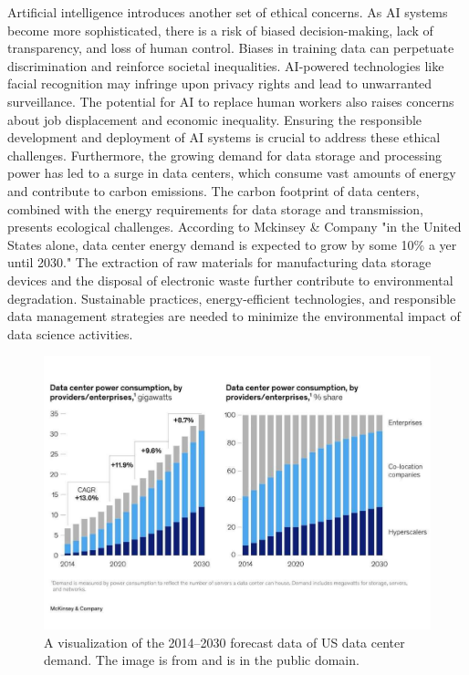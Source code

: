 \documentclass{vgtc}                          %
\begin{document}
Artificial intelligence introduces another set of ethical concerns. As AI systems become more sophisticated, there is a risk of biased decision-making, lack of transparency, and loss of human control. Biases 
in training data can perpetuate discrimination and reinforce societal inequalities. AI-powered technologies like facial recognition may infringe upon privacy rights and lead to unwarranted surveillance. The 
potential for AI to replace human workers also raises concerns about job displacement and economic inequality. Ensuring the responsible development and deployment of AI systems is crucial to address these ethical 
challenges. Furthermore, the growing demand for data storage and processing power has led to a surge in data centers, which consume vast amounts of energy and contribute to carbon emissions. The carbon footprint 
of data centers, combined with the energy requirements for data storage and transmission, presents ecological challenges. According to Mckinsey \& Company "in the United States alone, data center energy demand is 
expected to grow by some 10\% a yer until 2030."\cite{Bangalore:2023} The extraction of raw materials for manufacturing data storage devices and the disposal of electronic waste further contribute to environmental 
degradation. Sustainable practices, energy-efficient technologies, and responsible data management strategies are needed to minimize the environmental impact of data science activities.

\begin{figure}[h]
  \centering %
  \includegraphics[width=\columnwidth]{datacenter_demand}
  \caption{A visualization of the 2014--2030 forecast data of US data center demand. The image is from \cite{Bangalore:2023} and is in the public domain.}
  \label{fig:sample}
\end{figure}
\end{document}
